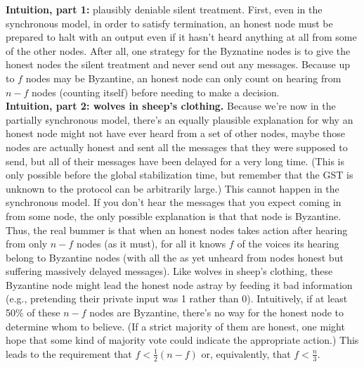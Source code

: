 \noindent
\textbf{Intuition, part 1:} plausibly deniable silent treatment. First, even in the synchronous
model, in order to satisfy termination, an honest node must be prepared to halt with an
output even if it hasn't heard anything at all from some of the other nodes. After all, one
strategy for the Byznatine nodes is to give the honest nodes the silent treatment and never
send out any messages. Because up to $f$ nodes may be Byzantine, an honest node can only
count on hearing from $n − f$ nodes (counting itself) before needing to make a decision.\\

\noindent
\textbf{Intuition, part 2: wolves in sheep’s clothing.}
Because we’re now in the partially
synchronous model, there’s an equally plausible explanation for why an honest node might
not have ever heard from a set of other nodes, maybe those nodes are actually honest and
sent all the messages that they were supposed to send, but all of their messages have been
delayed for a very long time. (This is only possible before the global stabilization time, but
remember that the GST is unknown to the protocol can be arbitrarily large.) This cannot
happen in the synchronous model. If you don’t hear the messages that you expect coming
in from some node, the only possible explanation is that that node is Byzantine.
Thus, the real bummer is that when an honest nodes takes action after hearing from only
$n − f$ nodes (as it must), for all it knows $f$ of the voices its hearing belong to Byzantine nodes
(with all the as yet unheard from nodes honest but suffering massively delayed messages).
Like wolves in sheep’s clothing, these Byzantine node might lead the honest node astray
by feeding it bad information (e.g., pretending their private input was 1 rather than 0).
Intuitively, if at least 50\% of these $n − f$ nodes are Byzantine, there’s no way for the honest
node to determine whom to believe. (If a strict majority of them are honest, one might hope
that some kind of majority vote could indicate the appropriate action.) This leads to the
requirement that $f < \frac{1}{2}(n − f)$ or, equivalently, that $f < \frac{n}{3}$.

